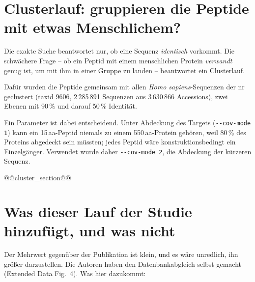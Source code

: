 \documentclass[11pt,a4paper]{article}
\begin{document}
\section{Clusterlauf: gruppieren die Peptide mit etwas Menschlichem?}

Die exakte Suche beantwortet nur, ob eine Sequenz \emph{identisch} vorkommt.
Die schwächere Frage -- ob ein Peptid mit einem menschlichen Protein
\emph{verwandt} genug ist, um mit ihm in einer Gruppe zu landen -- beantwortet
ein Clusterlauf.

Dafür wurden die Peptide gemeinsam mit allen \emph{Homo sapiens}-Sequenzen
der nr geclustert (taxid 9606, 2\,285\,891 Sequenzen aus 3\,630\,866
Accessions), zwei Ebenen mit 90\,\% und darauf 50\,\% Identität.

Ein Parameter ist dabei entscheidend. Unter Abdeckung des Targets
(\texttt{-{}-cov-mode 1})
 kann ein 15\,aa-Peptid niemals zu einem 550\,aa-Protein
gehören, weil 80\,\% des Proteins abgedeckt sein müssten; jedes Peptid wäre
konstruktionsbedingt ein Einzelgänger. Verwendet wurde daher
\texttt{-{}-cov-mode 2}, die Abdeckung der kürzeren Sequenz.

@@cluster_section@@

\section{Was dieser Lauf der Studie hinzufügt, und was nicht}

Der Mehrwert gegenüber der Publikation ist klein, und es wäre unredlich, ihn
größer darzustellen. Die Autoren haben den Datenbankabgleich selbst gemacht
(Extended Data Fig.~4). Was hier dazukommt:
\end{document}
